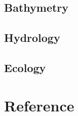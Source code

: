 \documentclass{article}
\begin{document}

\subsection{Bathymetry}



\subsection{Hydrology}



\subsection{Ecology}




\newpage
{}
\fancyfoot[C]{\thepage} 
\thispagestyle{fancy}
\section{Reference}
\end{document}
